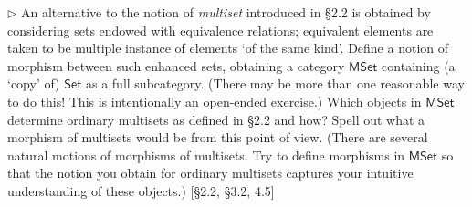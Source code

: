 \documentclass[12pt,letterpaper,boxed]{hmcpset}
\newcommand{\Set}{\mathsf{Set}}
\begin{document}
\hypertarget{Exercise I.3.9}{}
\begin{problem}[3.9]	
	$\rhd$ An alternative to the notion of \textit{multiset} introduced in
	\S2.2 is obtained by considering sets endowed with equivalence relations;
	equivalent elements are taken to be multiple instance of elements `of the same
	kind'. Define a notion of morphism between such enhanced sets, obtaining a
	category ${\mathsf{MSet}}$ containing (a `copy' of) $\Set$ as a full subcategory. (There
	may be more than one reasonable way to do this! This is intentionally an
	open-ended exercise.) Which objects in $\mathsf{MSet}$ determine ordinary multisets as
	defined in \S2.2 and how? Spell out what a morphism of multisets would be from
	this point of view. (There are several natural motions of morphisms of
	multisets. Try to define morphisms in $\mathsf{MSet}$ so that the notion you obtain for
	ordinary multisets captures your intuitive understanding of these objects.)
	[\S2.2, \S3.2, 4.5]
\end{problem}
\end{document}
